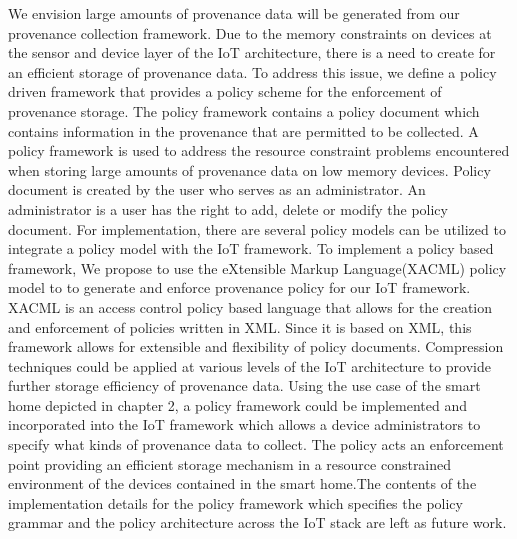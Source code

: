 \par We envision large amounts of provenance data will be generated from our provenance collection framework. Due to the memory constraints on devices at the sensor and device layer of the IoT architecture, there is a need to create for an efficient storage of provenance data. To address this issue, we define a policy driven framework that provides a policy scheme for the enforcement of provenance storage. The policy framework contains a policy document which contains information in the provenance that are permitted  to be collected. A policy framework is used to address the  resource constraint problems encountered when storing large amounts of provenance data on low memory devices. Policy document is created by the user who serves as an administrator. An administrator is a user has the right to add, delete or modify the policy document. For implementation, there are several policy models can be utilized to integrate a policy model  with the IoT framework. To implement a policy based framework, We propose to use the eXtensible Markup Language(XACML) policy model to to generate and enforce provenance policy for our IoT framework. XACML is an access control policy based language that allows for the creation and enforcement of policies written in XML. Since it is based on XML, this framework allows for extensible and flexibility of policy documents. Compression techniques could be applied at various levels of the IoT architecture to provide further storage efficiency of provenance data. Using the use case of the smart home depicted in chapter 2, a policy framework could be implemented and incorporated into the IoT framework which allows a device administrators to specify what kinds of provenance data to collect. The policy acts an enforcement point providing an efficient storage mechanism in a resource constrained environment of the devices contained in the smart home.The contents of the implementation details for the policy framework which specifies the policy grammar and the policy architecture across the IoT stack are left as future work.



%

